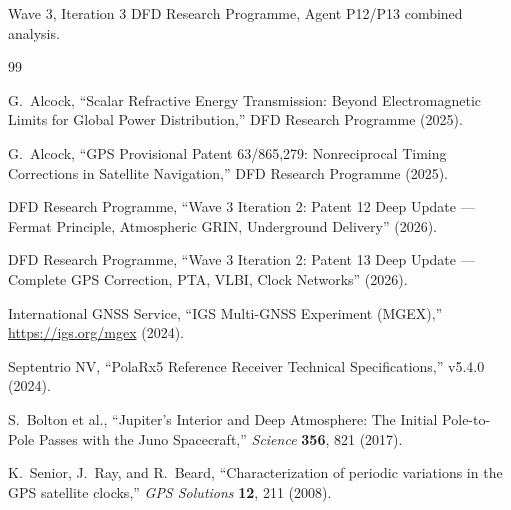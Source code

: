 \documentclass[aps,prd,twocolumn,superscriptaddress,nofootinbib]{revtex4-2}
\begin{document}
\begin{acknowledgments}
Wave 3, Iteration 3 DFD Research Programme, Agent P12/P13 combined
analysis.
\end{acknowledgments}

\begin{thebibliography}{99}

G.~Alcock, ``Scalar Refractive Energy Transmission:
Beyond Electromagnetic Limits for Global Power Distribution,''
DFD Research Programme (2025).

G.~Alcock, ``GPS Provisional Patent 63/865,279:
Nonreciprocal Timing Corrections in Satellite Navigation,''
DFD Research Programme (2025).

DFD Research Programme, ``Wave 3 Iteration 2: Patent 12 Deep Update ---
Fermat Principle, Atmospheric GRIN, Underground Delivery'' (2026).

DFD Research Programme, ``Wave 3 Iteration 2: Patent 13 Deep Update ---
Complete GPS Correction, PTA, VLBI, Clock Networks'' (2026).

International GNSS Service, ``IGS Multi-GNSS Experiment (MGEX),''
\url{https://igs.org/mgex} (2024).

Septentrio NV, ``PolaRx5 Reference Receiver Technical Specifications,''
v5.4.0 (2024).

S.~Bolton et al., ``Jupiter's Interior and Deep Atmosphere:
The Initial Pole-to-Pole Passes with the Juno Spacecraft,''
\textit{Science} \textbf{356}, 821 (2017).

K.~Senior, J.~Ray, and R.~Beard, ``Characterization of periodic
variations in the GPS satellite clocks,''
\textit{GPS Solutions} \textbf{12}, 211 (2008).

\end{thebibliography}
\end{document}
